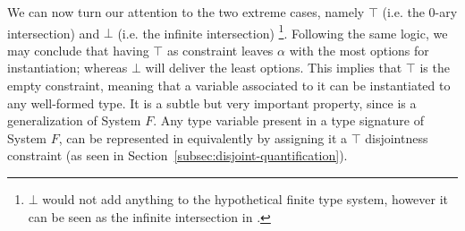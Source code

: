 We can now turn our attention to the two extreme cases, namely $\top$ 
(i.e. the 0-ary intersection) and $\bot$ (i.e. the infinite intersection) 
\footnote{$\bot$ would not add anything to the hypothetical finite type 
system, however it can be seen as the infinite intersection in \name.}.
Following the same logic, we may conclude that having $\top$ as constraint leaves $\alpha$ with 
the most options for instantiation; whereas $\bot$ will deliver the least options.
This implies that $\top$ is the empty constraint, meaning that a variable associated to it
can be instantiated to any well-formed type.
It is a subtle but very important property, since \name is a generalization of System $F$. 
Any type variable present in a type signature of System $F$, can be represented in \name
equivalently by assigning it a $\top$ disjointness constraint
(as seen in Section~\ref{subsec:disjoint-quantification}).

\begin{comment}
We will briefly discuss the role of the former in our system. 
\joao{maybe we can just refer to the overview and delete the next
  paragraph?}
\bruno{That could be an idea, yes.}

\paragraph{The most liberal bound.}
It is easy to see that $\top$ is the most liberal type since it is disjoint to everything. 
This means that the $\top$ type actually plays an important role in our system, since the latter 
must be complete with respect to System $F$. 
In other words, any program accepted by System $F$ should also be accepted by \name.
Since System $F$ does not contain disjointness quantification, $\top$ comes in handy:
the System $F$'s type $\forall \alpha. {T_F}$ (where ${T_F}$ is some other type), is
equivalent to \name's type $\fordis \alpha \top {T_i}$, where ${T_i}$ is also an equivalent 
translation of $T_{F}$.
An example of such translation has been given in Section~\ref{sec:overview}.
\end{comment}
